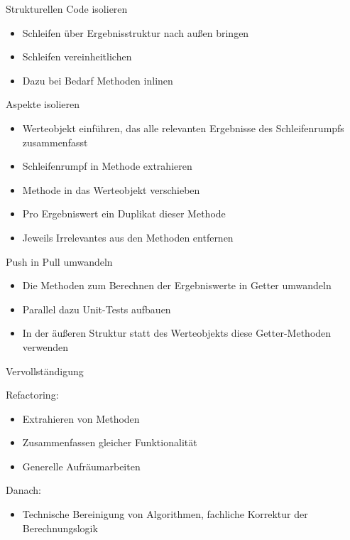 \begin{frame}[fragile]{Strukturellen Code isolieren}
\begin{itemize}
\item Schleifen über Ergebnisstruktur nach außen bringen
\item Schleifen vereinheitlichen
\item Dazu bei Bedarf Methoden inlinen
\end{itemize}
\end{frame}

\begin{frame}[fragile]{Aspekte isolieren}
\begin{itemize}
\item Werteobjekt einführen, das alle relevanten Ergebnisse des Schleifenrumpfs zusammenfasst
\item Schleifenrumpf in Methode extrahieren
\item Methode in das Werteobjekt verschieben
\item Pro Ergebniswert ein Duplikat dieser Methode
\item Jeweils Irrelevantes aus den Methoden entfernen
\end{itemize}
\end{frame}

\begin{frame}[fragile]{Push in Pull umwandeln}
\begin{itemize}
\item Die Methoden zum Berechnen der Ergebniswerte in Getter umwandeln
\item Parallel dazu Unit-Tests aufbauen
\item In der äußeren Struktur statt des Werteobjekts diese Getter-Methoden verwenden
\end{itemize}
\end{frame}

\begin{frame}[fragile]{Vervollständigung}

Refactoring: 
\begin{itemize}
\item Extrahieren von Methoden
\item Zusammenfassen gleicher Funktionalität
\item Generelle Aufräumarbeiten
\end{itemize}

\vspace{1em}
Danach: 
\begin{itemize}
\item Technische Bereinigung von Algorithmen, fachliche Korrektur der Berechnungslogik
\end{itemize}

\end{frame}

